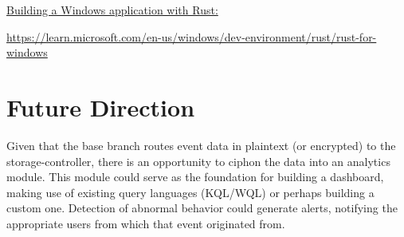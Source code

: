 \documentclass{article}
\begin{document}
\underline{Building a Windows application with Rust:}\vspace{0.25cm}

\url{https://learn.microsoft.com/en-us/windows/dev-environment/rust/rust-for-windows}


\section{Future Direction}

Given that the base branch routes event data in plaintext (or encrypted) to the storage-controller, there is an opportunity to ciphon the data into an analytics module. This module could serve as the foundation for building a dashboard, making use of existing query languages (KQL/WQL) or perhaps building a custom one. Detection of abnormal behavior could generate alerts, notifying the appropriate users from which that event originated from.
\end{document}
